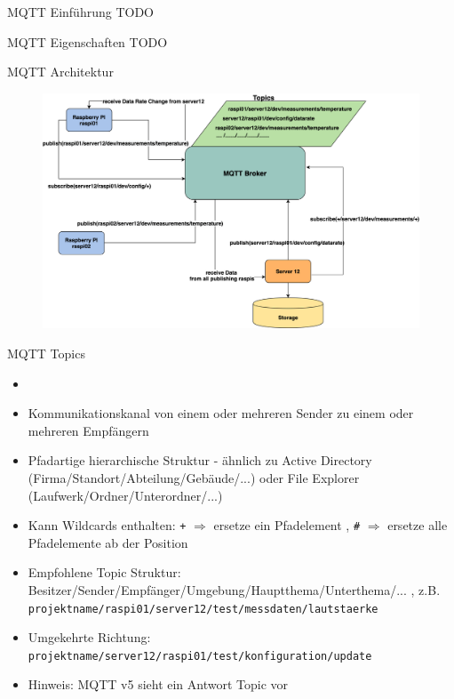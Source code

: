 \begin{frame}{MQTT Einführung}
    TODO
\end{frame}

\begin{frame}{MQTT Eigenschaften}
    TODO
\end{frame}


\begin{frame}{MQTT Architektur}
      \begin{figure}[!htb]
  \hspace*{5mm}
        \includegraphics[scale=0.15]{7-datenaustausch/img/mqttarch} 
    \end{figure}
\end{frame}


\begin{frame}{MQTT Topics}
     \begin{itemize}
        \setlength{\itemindent}{1.1in}
        \item [\textbf{MQTT Topics}]
    \end{itemize}
    \begin{itemize}
        \item Kommunikationskanal von einem oder mehreren Sender zu einem oder mehreren Empfängern
        \item Pfadartige hierarchische Struktur -  ähnlich zu Active Directory (Firma/Standort/Abteilung/Gebäude/...) oder File Explorer  (Laufwerk/Ordner/Unterordner/...) 
        \item Kann Wildcards enthalten:  \texttt{+} $\Rightarrow$ ersetze ein Pfadelement ,  \texttt{\#}  $\Rightarrow$ ersetze alle Pfadelemente ab der Position
        \item Empfohlene Topic Struktur:   Besitzer/Sender/Empfänger/Umgebung/Hauptthema/Unterthema/... , z.B.   \texttt{projektname/raspi01/server12/test/messdaten/lautstaerke}
        \item Umgekehrte Richtung:   \texttt{projektname/server12/raspi01/test/konfiguration/update}
        \item Hinweis: MQTT v5 sieht ein Antwort Topic vor
    \end{itemize}    
\end{frame}

